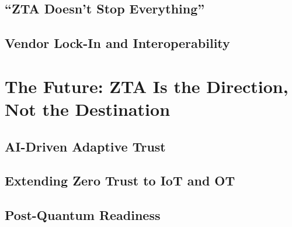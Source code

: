 \documentclass[12pt, letterpaper]{article}
\begin{document}
\subsection{``ZTA Doesn't Stop Everything''}

\subsection{Vendor Lock-In and Interoperability}

\section{The Future: ZTA Is the Direction, Not the Destination}

\subsection{AI-Driven Adaptive Trust}

\subsection{Extending Zero Trust to IoT and OT}

\subsection{Post-Quantum Readiness}
\end{document}
